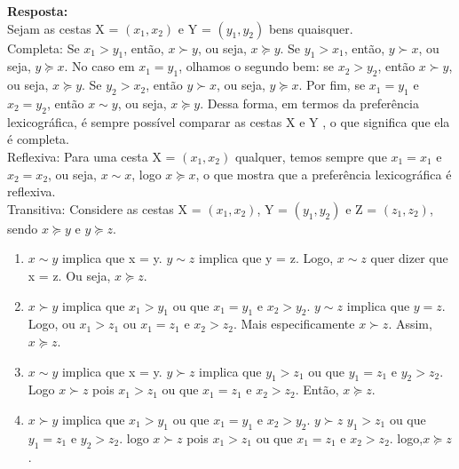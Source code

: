 \begin{enumerate}
\textbf{Resposta:}\\

Sejam as cestas X = {$(x_1,x_2)$} e Y = {$(y_1,y_2)$} bens quaisquer.\\ 

Completa: Se {$x_1 > y_1$}, então, {$x \succ y$}, ou seja, {$x \succeq y$}. Se {$y_1 > x_1$}, então, {$y \succ x$}, ou seja, {$y \succeq x$}. No caso em {$x_1 = y_1$}, olhamos o segundo bem: se {$x_2 > y_2$}, então {$x \succ  y$}, ou seja, {$x \succeq y$}. Se {$y_2 > x_2$}, então {$y \succ x$}, ou
seja, {$y \succeq x$}. Por fim, se {$x_1 = y_1$} e {$x_2 = y_2$}, então {$x \sim y$}, ou seja, {$x \succeq y$}. Dessa forma, em termos da preferência lexicográfica, é sempre possível comparar as cestas X e Y , o que significa que ela é completa.\\

Reflexiva: Para uma cesta X = {$(x_1, x_2)$} qualquer, temos sempre que {$x_1 = x_1$} e {$x_2 = x_2$}, ou
seja, {$x\sim x$}, logo {$x \succeq x$}, o que mostra que a preferência lexicográfica é reflexiva.\\

Transitiva: Considere as cestas X = {$(x_1, x_2)$}, Y = {$(y_1, y_2)$} e Z = {$(z_1, z_2)$}, sendo {$x \succeq y$} e {$y \succeq z$}.
\begin{enumerate}

\item {$x \sim y$} implica que x = y. {$y \sim z$} implica que y = z. Logo, {$x \sim z$} quer dizer que x = z. Ou seja, {$ x\succeq z$}.

\item {$x \succ y$} implica que {$ x_{1} > y_{1}$} ou que {$x_{1} = y_{1}$} e {$x_{2} > y_{2}$}. {$y \sim z$} implica que {$y = z$}. Logo, ou {$x_{1} > z_{1}$} ou {$x_{1} = z_{1}$} e {$x_{2} > z_{2}$}. Mais especificamente {$x \succ z$}. Assim, {$ x\succeq z$}.

\item {$x \sim y$} implica que x = y.  {$y \succ z$} implica que {$ y_{1} > z_{1}$} ou que {$y_{1} = z_{1}$} e {$y_{2} > z_{2}$}. Logo {$x \succ z$} pois {$ x_{1} > z_{1}$} ou que {$x_{1} = z_{1}$} e {$x_{2} > z_{2}$}. Então, {$ x\succeq z$}.

\item {$x \succ y$} implica que  {$ x_{1} > y_{1}$} ou que {$x_{1} = y_{1}$} e {$x_{2} > y_{2}$}. {$y \succ z$} {$ y_{1} > z_{1}$} ou que {$y_{1} = z_{1}$} e {$y_{2} > z_{2}$}. logo {$x \succ z$} pois {$ x_{1} > z_{1}$} ou que {$x_{1} = z_{1}$} e {$x_{2} > z_{2}$}. logo,{$ x\succeq z$}. \\
 

\end{enumerate}
\end{enumerate}
